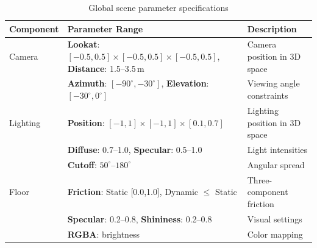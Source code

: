 \documentclass[conference]{IEEEtran}
\begin{document}
\begin{table}[t]
\centering
\renewcommand{\arraystretch}{1.5}
\setlength{\tabcolsep}{4pt} 
\caption{Global scene parameter specifications}
\label{tab:scene_params}
\begin{tabular}{|l|p{3.5cm}|p{3.0cm}|}
\hline
\textbf{Component} & \textbf{Parameter Range} & \textbf{Description} \\
\hline
Camera & \textbf{Lookat}: $[-0.5,0.5] \times [-0.5,0.5] \times [-0.5,0.5] $, \textbf{Distance}: 1.5--3.5\,m & Camera position in 3D space \\
       & \textbf{Azimuth}: $[-90^\circ, -30^\circ]$, \textbf{Elevation}: $[-30^\circ, 0^\circ]$ & Viewing angle constraints \\
Lighting & \textbf{Position}: $[-1,1] \times [-1,1] \times [0.1,0.7]$ & Lighting position in 3D space \\
         & \textbf{Diffuse}: 0.7--1.0, \textbf{Specular}: 0.5--1.0 & Light intensities \\
         & \textbf{Cutoff}: $50^\circ$--$180^\circ$ & Angular spread \\
Floor & \textbf{Friction}: Static [0.0,1.0], Dynamic $\leq$ Static & Three-component friction \\
      & \textbf{Specular}: 0.2--0.8, \textbf{Shininess}: 0.2--0.8 & Visual settings \\
      & \textbf{RGBA}: brightness  & Color mapping \\
\hline
\end{tabular}
\end{table}
\end{document}
